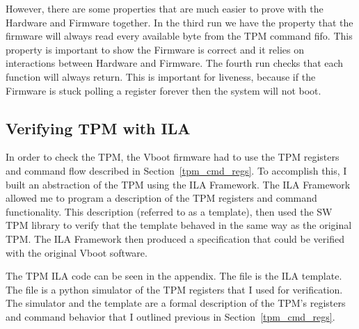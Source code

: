 However, there are some properties that are much easier to prove with the 
Hardware and Firmware together.
In the third run we have the property that the firmware will always read every available byte from the TPM command fifo.
This property is important to show the Firmware is correct and it relies on interactions between Hardware and Firmware.
The fourth run checks that each function will always return. 
This is important for liveness, because if the Firmware is stuck polling a register forever then the system will not boot.


\subsection{Verifying TPM with ILA}   

In order to check the TPM, the Vboot firmware had to use the TPM registers and
command flow  described in Section~\ref{tpm_cmd_regs}.
To accomplish this, I built an abstraction of the TPM using the ILA Framework.
The ILA Framework allowed me to program a description of the TPM registers and
command functionality.
This description (referred to as a template), then used the SW TPM library to
verify that the template behaved in the same way as the original TPM. 
The ILA Framework then produced a specification that could be verified with the
original Vboot software.

The TPM ILA code can be seen in the appendix.
The file  is the ILA template.
The file  is a python simulator of the TPM registers that
I used for verification.
The simulator and the template are a formal description of the TPM's registers and command behavior that I outlined previous in Section~\ref{tpm_cmd_regs}. 
